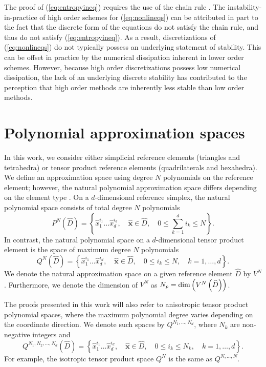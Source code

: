 \documentclass{svjour3}                     %
\renewcommand{\hat}{\widehat}
\newcommand{\LRp}[1]{\left( #1 \right)}
\newcommand{\LRc}[1]{\left\{ #1 \right\}}
\begin{document}
The proof of (\ref{eq:entropyineq}) requires the use of the chain rule \cite{mock1980systems, harten1983symmetric, dafermos2005compensated}.  The instability-in-practice of high order schemes for (\ref{eq:nonlineqs}) can be attributed in part to the fact that the discrete form of the equations do not satisfy the chain rule, and thus do not satisfy (\ref{eq:entropyineq}).  As a result, discretizations of (\ref{eq:nonlineqs}) do not typically possess an underlying statement of stability.  This can be offset in practice by the numerical dissipation inherent in lower order schemes.  However, because high order discretizations possess low numerical dissipation, the lack of an underlying discrete stability has contributed to the perception that high order methods are inherently less stable than low order methods.

\section{Polynomial approximation spaces}
\label{sec:approx}

In this work, we consider either simplicial reference elements (triangles and tetrahedra) or tensor product reference elements (quadrilaterals and hexahedra).  We define an approximation space using degree $N$ polynomials on the reference element; however, the natural polynomial approximation space differs depending on the element type \cite{chan2015gpu}.  On a $d$-dimensional reference simplex, the natural polynomial space consists of total degree $N$ polynomials 
\[
P^N\LRp{\hat{D}} = \LRc{\hat{x}_1^{i_1}\ldots\hat{x}_d^{i_d}, \quad \hat{\bm{x}} \in \hat{D}, \quad 0\leq \sum_{k=1}^d i_k \leq N}.
\]
In contrast, the natural polynomial space on a $d$-dimensional tensor product element is the space of maximum degree $N$ polynomials
\[
Q^N\LRp{\hat{D}} = \LRc{\hat{x}_1^{i_1}\ldots\hat{x}_d^{i_d}, \quad \hat{\bm{x}} \in \hat{D}, \quad 0\leq i_k \leq N, \quad k = 1,\ldots, d}.
\]
We denote the natural approximation space on a given reference element $\hat{D}$ by $V^N$.  Furthermore, we denote the dimension of $V^N$ as $N_p = {\rm dim}\LRp{V^N\LRp{\hat{D}}}$.  

The proofs presented in this work will also refer to anisotropic tensor product polynomial spaces, where the maximum polynomial degree varies depending on the coordinate direction.  We denote such spaces by $Q^{N_1, \ldots, N_d}$, where $N_k$ are non-negative integers and
\[
Q^{N_1, N_2, \ldots, N_d}\LRp{\hat{D}} = \LRc{\hat{x}_1^{i_1}\ldots\hat{x}_d^{i_d}, \quad \hat{\bm{x}} \in \hat{D}, \quad 0\leq i_k \leq N_k, \quad k = 1,\ldots, d}.
\]
For example, the isotropic tensor product space $Q^N$ is the same as $Q^{N,\ldots,N}$.
\end{document}
